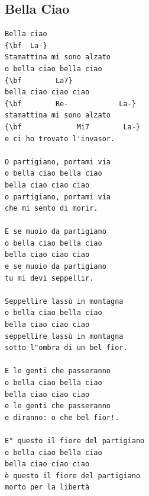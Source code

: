 \documentclass[a4paper]{article}
\begin{document}
\subsection{Bella Ciao}
\begin{multicols}{2}\begin{Verbatim}[commandchars=\\\{\}]
Bella ciao
{\bf  La-}
Stamattina mi sono alzato
o bella ciao bella ciao
{\bf        La7}
bella ciao ciao ciao
{\bf        Re-            La-}
stamattina mi sono alzato
{\bf             Mi7        La-}
e ci ho trovato l'invasor.

O partigiano, portami via
o bella ciao bella ciao
bella ciao ciao ciao
o partigiano, portami via
che mi sento di morir.

E se muoio da partigiano
o bella ciao bella ciao
bella ciao ciao ciao
e se muoio da partigiano
tu mi devi seppellir.

Seppellire lassù in montagna
o bella ciao bella ciao
bella ciao ciao ciao
seppellire lassù in montagna
sotto l"ombra di un bel fior.

E le genti che passeranno
o bella ciao bella ciao
bella ciao ciao ciao
e le genti che passeranno
e diranno: o che bel fior!.

E" questo il fiore del partigiano
o bella ciao bella ciao
bella ciao ciao ciao
è questo il fiore del partigiano
morto per la libertà

\end{Verbatim}
\end{multicols}\newpage
\end{document}
